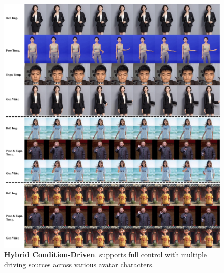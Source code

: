 \begin{figure}[h]
    \centering
    \includegraphics[width=\linewidth]{applications/app_figures/pose-expr-1.pdf}
    \caption{\textbf{Hybrid Condition-Driven}. {\nameofmethod} supports full control with multiple driving sources across various avatar characters.}
    \label{fig:application-pose-expr}
\end{figure}